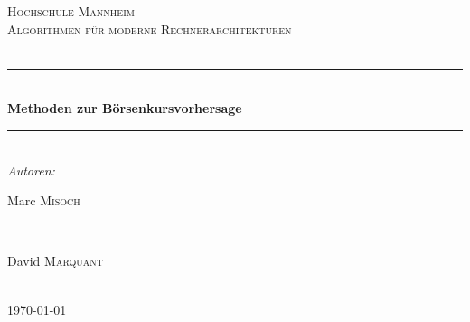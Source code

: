 \documentclass[12pt]{article} %
\begin{document}

\begin{titlepage}

\newcommand{\HRule}{\rule{\linewidth}{0.5mm}} %

\center %

\textsc{\LARGE Hochschule Mannheim}\\[1.5cm] %
\textsc{\Large Algorithmen für moderne Rechnerarchitekturen}\\[0.5cm] %
\textsc{\large  }\\[0.5cm] %

\HRule \\[0.4cm]
{ \huge \bfseries Methoden zur Börsenkursvorhersage}\\[0.4cm] %
\HRule \\[1.5cm]

{\centering \emph{Autoren:}}
\\

\begin{minipage}{0.4\textwidth}
\begin{flushleft} \large
Marc \textsc{Misoch} 
\end{flushleft}
\end{minipage}
~
\begin{minipage}{0.4\textwidth}
\begin{flushright} \large
David \textsc{Marquant} %
\end{flushright}
\end{minipage}\\[4cm]

{\large \today}\\[3cm] %


\vfill %

\end{titlepage}

\end{document}

